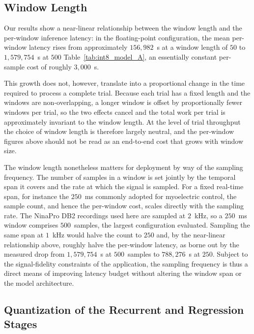 \documentclass[12pt,DIV16,BCOR12mm,a4paper,footinclude=false,headinclude,parskip=half-,twoside,openright,cleardoublepage=empty,toc=index,bibliography=totoc,listof=totoc]{scrreprt}
\numberwithin{equation}{chapter}
\begin{document}
  \subsection{Window Length}

  Our results show a near-linear relationship between the window length and the
  per-window inference latency: in the floating-point configuration, the mean
  per-window latency rises from approximately $156{,}982$~\textmu s at a window
  length of $50$ to $1{,}579{,}754$~\textmu s at $500$ Table~\ref{tab:int8_model_A}, an essentially constant
  per-sample cost of roughly $3{,}000$~\textmu s.

  This growth does not, however, translate into a proportional change in the time
  required to process a complete trial. Because each trial has a fixed length and
  the windows are non-overlapping, a longer window is offset by proportionally
  fewer windows per trial, so the two effects cancel and the total work per trial
  is approximately invariant to the window length. At the level of trial
  throughput the choice of window length is therefore largely neutral, and the
  per-window figures above should not be read as an end-to-end cost that grows
  with window size.

  The window length nonetheless matters for deployment by way of the sampling
  frequency. The number of samples in a window is set jointly by the temporal
  span it covers and the rate at which the signal is sampled. For a fixed
  real-time span, for instance the $250$~ms commonly adopted for myoelectric
  control, the sample count, and hence the per-window cost, scales directly with
  the sampling rate. The NinaPro DB2 recordings used here are sampled at
  $2$~kHz, so a $250$~ms window comprises $500$~samples, the largest configuration
  evaluated. Sampling the same span at $1$~kHz would halve the count to $250$
  and, by the near-linear relationship above, roughly halve the per-window
  latency, as borne out by the measured drop from $1{,}579{,}754$~\textmu s at
  $500$~samples to $788{,}276$~\textmu s at $250$. Subject to the
  signal-fidelity constraints of the application, the sampling frequency is thus a
  direct means of improving latency budget without altering the window
  span or the model architecture.

  \subsection{Quantization of the Recurrent and Regression Stages}
\end{document}
